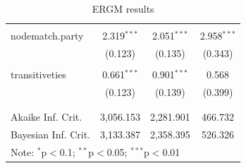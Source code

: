 \documentclass[fleqn,12pt]{wlscirep}
\begin{document}
\begin{table}
\begin{center}
\begin{tabular}{l c c c }
  & & & \\ 
 nodematch.party & 2.319$^{***}$ & 2.051$^{***}$ & 2.958$^{***}$ \\ 
  & (0.123) & (0.135) & (0.343) \\ 
  & & & \\ 
 transitiveties & 0.661$^{***}$ & 0.901$^{***}$ & 0.568 \\ 
  & (0.123) & (0.139) & (0.399) \\ 
  & & & \\ 
\hline \\[-1.8ex] 
Akaike Inf. Crit. & 3,056.153 & 2,281.901 & 466.732 \\ 
Bayesian Inf. Crit. & 3,133.387 & 2,358.395 & 526.326 \\ 
\hline
\multicolumn{4}{l}{\scriptsize{Note: {$^{*}$p$<$0.1; $^{**}$p$<$0.05; $^{***}$p$<$0.01}}}
\end{tabular}
\caption{ERGM results}
\label{table:coefficients}
\end{center}
\end{table}
\end{document}
